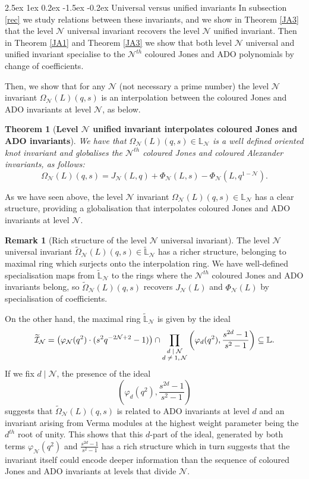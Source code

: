 \documentclass[reqno,a4paper,11pt]{amsart}
\makeatletter
\numberwithin{equation}{section}
\numberwithin{figure}{section}
\theoremstyle{definition}
\newtheorem{rmk}[defn]{Remark}
\theoremstyle{plain}
\newtheorem{thm}[defn]{Theorem}
\renewcommand*{\subsection}{\@startsection{subsection}{2}{\z@}%
	{2.5ex \@plus 1ex \@minus 0.2ex}%
	{-1.5ex \@plus -0.2ex}%
	{\normalfont\normalsize\bfseries}}
\newcommand{\Li}{{\mathbb L}}
\newcommand{\Liq}{\mathbb L}
\newcommand{\cI}{\mathcal{I}}
\newcommand{\cN}{\mathcal{N}}
\makeatother
\begin{document}
 \subsection{Universal versus unified invariants}
 In subsection \ref{rec} we study relations between these invariants, and we show in Theorem \ref{JA3} that the level $\cN$ universal invariant recovers the level $\cN$ unified invariant. Then in Theorem  \ref{JA1} and Theorem \ref{JA3} we show that both level $\cN$ universal and unified invariant specialise to the $\cN^{th}$ coloured Jones and ADO polynomials by change of coefficients. 
 \par
 Then, we show that for any $\cN$ (not necessary a prime number) the level $\cN$ invariant $\Omega_{\cN}(L)(q,s)$ is an interpolation between the coloured Jones and ADO invariants at level $\cN$, as below.
%
 \begin{thm}[{\bf Level $\cN$ unified invariant interpolates coloured Jones and ADO invariants}]\label{TINT} We have that  $\Omega_{\cN}(L)(q,s) \in \Li_{\cN}$ is a well defined oriented knot invariant and globalises the $\cN^{th}$ coloured Jones and coloured Alexander invariants, as follows: 
 \begin{equation}
\Omega_{\cN}(L)(q,s) = J_{\mathcal{N}}(L, q) + \Phi_{\mathcal{N}}(L, s) - \Phi_{\mathcal{N}}(L, q^{1-\mathcal N}).
\end{equation}
 \end{thm}
As we have seen above, the level $\cN$ invariant $\Omega_{\cN}(L)(q,s) \in \Li_{\cN}$ has a clear structure, providing a globalisation that interpolates coloured Jones and ADO invariants at level $\cN$. 
%
\begin{rmk}[Rich structure of the level $\cN$ universal invariant] 
The level $\cN$ universal invariant  $\widetilde{\Omega}_{\cN}(L)(q,s) \in \widetilde{\Li}_{\cN}$ has a richer structure, belonging to maximal ring which surjects onto the interpolation ring. We have well-defined specialisation maps from $\widetilde{\Li}_{\cN}$ to the rings where the $\cN^{th}$ coloured Jones and ADO invariants belong, so $\widetilde{\Omega}_{\cN}(L)(q,s) $ recovers $J_{\cN}(L)$ and $\Phi_{\cN}(L)$ by specialisation of coefficients. 
\par
On the other hand, the maximal ring $\widetilde{\Li}_{\cN}$ is given by the ideal 
$$
\widetilde{\cI}_\cN=\left( \varphi_\cN(q^2) \cdot (s^2 q^{-2\cN+2} - 1)\right)  \cap \prod_{\text{\scriptsize$\begin{matrix} d\mid \cN \\ d \neq 1, \cN \end{matrix}$}}\left(\varphi_d(q^2), \frac{s^{2d}-1}{s^2-1} \right) \subseteq \Liq.
$$
%
If we fix $d \mid \cN$, the presence of the ideal
$$
\left(\varphi_d(q^2), \frac{s^{2d}-1}{s^2-1}\right)
$$ 
suggests that $\widetilde{\Omega}_{\cN}(L)(q,s) $ is related to ADO invariants at level $d$ and an invariant arising from Verma modules at the highest weight parameter being the $d^{th}$ root of unity. This shows that this $d$-part of the ideal, generated by both terms $\varphi_\cN(q^2)$ and $\frac{s^{2d}-1}{s^2-1}$  has a rich structure which in turn suggests that the invariant itself could encode deeper information than the sequence of coloured Jones and ADO invariants at levels that divide $\cN$.
\end{rmk}
\end{document}
